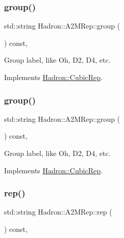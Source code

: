 \subsubsection{\texorpdfstring{group()}{group()}\hspace{0.1cm}{\footnotesize\ttfamily [1/2]}}
{\footnotesize\ttfamily std\+::string Hadron\+::\+A2\+M\+Rep\+::group (\begin{DoxyParamCaption}{ }\end{DoxyParamCaption}) const\hspace{0.3cm}{\ttfamily [inline]}, {\ttfamily [virtual]}}

Group label, like Oh, D2, D4, etc. 

Implements \mbox{\hyperlink{structHadron_1_1CubicRep_a0748f11ec87f387062c8e8981339a29c}{Hadron\+::\+Cubic\+Rep}}.

\mbox{\label{structHadron_1_1A2MRep_acc01c7c94d15b610d4366faa2bc3afaf}} 
\subsubsection{\texorpdfstring{group()}{group()}\hspace{0.1cm}{\footnotesize\ttfamily [2/2]}}
{\footnotesize\ttfamily std\+::string Hadron\+::\+A2\+M\+Rep\+::group (\begin{DoxyParamCaption}{ }\end{DoxyParamCaption}) const\hspace{0.3cm}{\ttfamily [inline]}, {\ttfamily [virtual]}}

Group label, like Oh, D2, D4, etc. 

Implements \mbox{\hyperlink{structHadron_1_1CubicRep_a0748f11ec87f387062c8e8981339a29c}{Hadron\+::\+Cubic\+Rep}}.

\mbox{\label{structHadron_1_1A2MRep_ad219824d3a5220f47e6f3b38d2a60102}} 
\subsubsection{\texorpdfstring{rep()}{rep()}\hspace{0.1cm}{\footnotesize\ttfamily [1/2]}}
{\footnotesize\ttfamily std\+::string Hadron\+::\+A2\+M\+Rep\+::rep (\begin{DoxyParamCaption}{ }\end{DoxyParamCaption}) const\hspace{0.3cm}{\ttfamily [inline]}, {\ttfamily [virtual]}}

